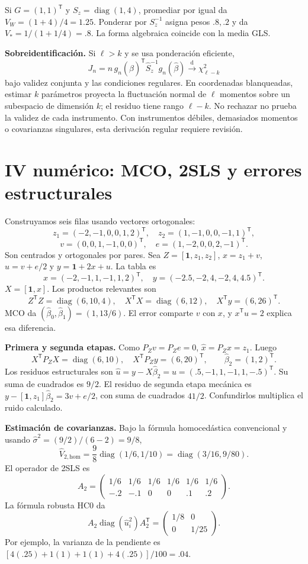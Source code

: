\documentclass[11pt,a4paper]{article}
\newcommand{\T}{^{\mathsf T}}
\newcommand{\ones}{\mathbf 1}
\DeclareMathOperator{\diag}{diag}
\newcommand{\dto}{\xrightarrow{\mathrm d}}
\newcommand{\topic}[2]{\clearpage\section{#1}\label{#2}}
\theoremstyle{definition}\newtheorem{definicion}[teorema]{Definición}
\begin{document}
\begin{ejemplo}
Si $G=(1,1)\T$ y $S_z=\diag(1,4)$, promediar por igual da
$V_W=(1+4)/4=1.25$.
Ponderar por $S_z^{-1}$ asigna pesos $.8,.2$ y da
$V_*=1/(1+1/4)=.8$.
La forma algebraica coincide con la media GLS.
\end{ejemplo}
\textbf{Sobreidentificación.}
Si $\ell>k$ y se usa ponderación eficiente,
\[
J_n=n\,g_n(\widehat\beta)\T\widehat S_z^{-1}g_n(\widehat\beta)
\dto\chi^2_{\ell-k}
\]
bajo validez conjunta y las condiciones regulares.
En coordenadas blanqueadas, estimar $k$ parámetros proyecta la fluctuación
normal de $\ell$ momentos sobre un subespacio de dimensión $k$;
el residuo tiene rango $\ell-k$.
No rechazar no prueba la validez de cada instrumento.
Con instrumentos débiles, demasiados momentos o covarianzas singulares,
esta derivación regular requiere revisión.

\topic{IV numérico: MCO, 2SLS y errores estructurales}{s48}
Construyamos seis filas usando vectores ortogonales:
\[
z_1=(-2,-1,0,0,1,2)\T,\quad z_2=(1,-1,0,0,-1,1)\T,
\]
\[
v=(0,0,1,-1,0,0)\T,\quad e=(1,-2,0,0,2,-1)\T.
\]
Son centrados y ortogonales por pares. Sea
$Z=[\ones,z_1,z_2]$, $x=z_1+v$, $u=v+e/2$ y
$y=\ones+2x+u$. La tabla es
\[
x=(-2,-1,1,-1,1,2)\T,\quad
y=(-2.5,-2,4,-2,4,4.5)\T.
\]
$X=[\ones,x]$. Los productos relevantes son
\[
Z\T Z=\diag(6,10,4),\quad
X\T X=\diag(6,12),\quad
X\T y=(6,26)\T.
\]
MCO da $(\widehat\beta_0,\widehat\beta_1)=(1,13/6)$.
El error comparte $v$ con $x$, y $x\T u=2$ explica esa diferencia.

\textbf{Primera y segunda etapas.}
Como $P_Zv=P_Ze=0$, $\widehat x=P_Zx=z_1$.
Luego
\[
X\T P_ZX=\diag(6,10),\quad
X\T P_Zy=(6,20)\T,\qquad
\boxed{\widehat\beta_2=(1,2)\T}.
\]
Los residuos estructurales son
$\widehat u=y-X\widehat\beta_2=u=(.5,-1,1,-1,1,-.5)\T$.
Su suma de cuadrados es $9/2$.
El residuo de segunda etapa mecánica es
$y-[\ones,z_1]\widehat\beta_2=3v+e/2$,
con suma de cuadrados $41/2$. Confundirlos multiplica el ruido calculado.

\textbf{Estimación de covarianzas.}
Bajo la fórmula homocedástica convencional y usando
$\widehat\sigma^2=(9/2)/(6-2)=9/8$,
\[
\widehat V_{2,\mathrm{hom}}
=\frac98\diag(1/6,1/10)=\diag(3/16,9/80).
\]
El operador de 2SLS es
\[
A_2=\begin{pmatrix}
1/6&1/6&1/6&1/6&1/6&1/6\\
-.2&-.1&0&0&.1&.2
\end{pmatrix}.
\]
La fórmula robusta HC0 da
\[
A_2\diag(\widehat u_i^2)A_2\T
=\boxed{\begin{pmatrix}1/8&0\\0&1/25\end{pmatrix}}.
\]
Por ejemplo, la varianza de la pendiente es
$[4(.25)+1(1)+1(1)+4(.25)]/100=.04$.
\end{document}
